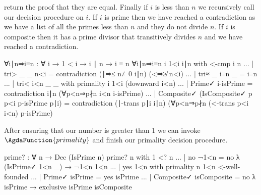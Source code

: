 \documentclass[./Thesis.tex]{subfiles}
\begin{document}
return the proof that they are equal. Finally if $i$ is less than $n$ we
recursively call our decision procedure on $i$. If $i$ is prime then we have
reached a contradiction as we have a list of all the primes less than $n$ and
they do not divide $n$. If $i$ is composite then it has a prime divisor that
transitively divides $n$ and we have reached a contradiction.
\begin{code}
    ∀i∣n⇒i≡n : ∀ {i} → 1 < i → i ∣ n → i ≡ n
    ∀i∣n⇒i≡n {i} 1<i i∣n with <-cmp i n
    ... | tri> _ _ n<i = contradiction (∣⇒≤ n≢0 i∣n) (<⇒≱ n<i)
    ... | tri≈ _ i≡n _ = i≡n
    ... | tri< i<n _ _ with primality i 1<i (downward i<n)
    ...   | Prime✓ i-isPrime
          = contradiction i∣n (∀p<n⇒p∤n i<n i-isPrime)
    ...   | Composite✓ (IsComposite✓ p p<i p-isPrime p∣i)
          = contradiction (∣-trans p∣i i∣n) (∀p<n⇒p∤n (<-trans p<i i<n) p-isPrime)
\end{code}
After ensuring that our number is greater than $1$ we can invoke
$\AgdaFunction{primality}$ and finish our primality decision procedure.
\begin{code}
  prime? : ∀ n → Dec (IsPrime n)
  prime? n with 1 <? n
  ... | no ¬1<n = no λ { (IsPrime✓ 1<n _) → ¬1<n 1<n }
  ... | yes 1<n with primality n 1<n <-well-founded
  ... | Prime✓ isPrime = yes isPrime
  ... | Composite✓ isComposite = no λ { isPrime → exclusive isPrime isComposite }
\end{code}
\end{document}
